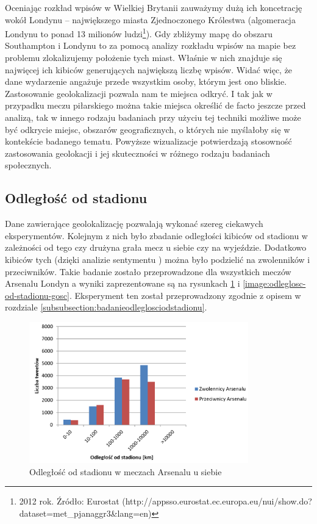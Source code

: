 Oceniając rozkład wpisów w Wielkiej Brytanii  zauważymy
dużą ich koncetrację wokół Londynu -- największego miasta Zjednoczonego
Królestwa (algomeracja Londynu to ponad 13 milionów ludzi\footnote{2012 rok.
Źródło: Eurostat
(http://appsso.eurostat.ec.europa.eu/nui/show.do?dataset=met\_pjanaggr3\&lang=en)}).
Gdy zbliżymy mapę do obszaru Southampton i Londynu 
to za pomocą analizy rozkładu wpisów na mapie bez problemu zlokalizujemy
położenie tych miast.
Właśnie w nich znajduje się najwięcej ich kibiców generujących największą liczbę
wpisów.
Widać więc, że dane wydarzenie angażuje przede wszystkim osoby, którym jest ono
bliskie. Zastosowanie geolokalizacji pozwala nam te miejsca odkryć. I tak jak w
przypadku meczu piłarskiego można takie miejsca określić de facto jeszcze przed
analizą, tak w innego rodzaju badaniach przy użyciu tej techniki możliwe może
być odkrycie miejsc, obszarów geograficznych, o których nie myślałoby się w
kontekście badanego tematu. Powyższe wizualizacje potwierdzają stosowność
zastosowania geolokacji i jej skuteczności w różnego rodzaju badaniach
społecznych.

\subsection{Odległość od stadionu}
\label{subsection:odlegloscodstadionu}
Dane zawierające geolokalizację pozwalają wykonać szereg ciekawych
eksperymentów.
Kolejnym z nich było zbadanie odległości kibiców od stadionu w zależności od
tego czy drużyna grała mecz u siebie czy na wyjeździe. Dodatkowo kibiców tych
(dzięki analizie sentymentu ) można
było podzielić na zwolenników i przeciwników. Takie badanie zostało
przeprowadzone dla wszystkich meczów Arsenalu Londyn a wyniki zaprezentowane są
na rysunkach \ref{image:odleglosc-od-stadionu-gospodarz} i
\ref{image:odleglosc-od-stadionu-gosc}.
Eksperyment ten został przeprowadzony zgodnie z opisem w rozdziale
\ref{subsubsection:badanieodleglosciodstadionu}.

\begin{figure}[ht!]
\centering
\includegraphics[width=95mm]{img/odleglosc-od-stadionu-home.PNG}
\caption{Odległość od stadionu w meczach Arsenalu u siebie}
\label{image:odleglosc-od-stadionu-gospodarz}
\end{figure}


